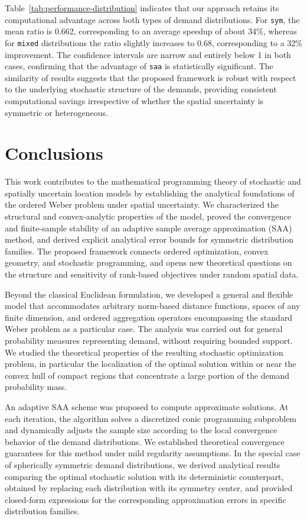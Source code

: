 \documentclass[letter,11pt, reqno]{amsart}
\renewcommand{\;}{\quad}
\theoremstyle{thmstyleone}%
\theoremstyle{thmstyletwo}%
\theoremstyle{thmstylethree}%
\begin{document}
Table~\ref{tab:performance-distribution} indicates that our approach retains its computational advantage across both types of demand distributions. 
For \texttt{sym}, the mean ratio is 0.662, corresponding to an average speedup of about 34\%, 
whereas for \texttt{mixed} distributions the ratio slightly increases to 0.68, corresponding to a 32\% improvement. 
The confidence intervals are narrow and entirely below 1 in both cases, confirming that the advantage of \texttt{saa} is statistically significant. 
The similarity of results suggests that the proposed framework is robust with respect to the underlying stochastic structure of the demands, providing consistent computational savings irrespective of whether the spatial uncertainty is symmetric or heterogeneous.

\section{Conclusions}\label{sec:conc}

This work contributes to the mathematical programming theory of stochastic and spatially uncertain location models by establishing the analytical foundations of the ordered Weber problem under spatial uncertainty. We characterized the structural and convex-analytic properties of the model, proved the convergence and finite-sample stability of an adaptive sample average approximation (SAA) method, and derived explicit analytical error bounds for symmetric distribution families. The proposed framework connects ordered optimization, convex geometry, and stochastic programming, and opens new theoretical questions on the structure and sensitivity of rank-based objectives under random spatial data.

Beyond the classical Euclidean formulation, we developed a general and flexible model that accommodates arbitrary norm-based distance functions, spaces of any finite dimension, and ordered aggregation operators encompassing the standard Weber problem as a particular case. The analysis was carried out for general probability measures representing demand, without requiring bounded support. We studied the theoretical properties of the resulting stochastic optimization problem, in particular the localization of the optimal solution within or near the convex hull of compact regions that concentrate a large portion of the demand probability mass.

An adaptive SAA scheme was proposed to compute approximate solutions. At each iteration, the algorithm solves a discretized conic programming subproblem and dynamically adjusts the sample size according to the local convergence behavior of the demand distributions. We established theoretical convergence guarantees for this method under mild regularity assumptions. In the special case of spherically symmetric demand distributions, we derived analytical results comparing the optimal stochastic solution with its deterministic counterpart, obtained by replacing each distribution with its symmetry center, and provided closed-form expressions for the corresponding approximation errors in specific distribution families.
\end{document}
